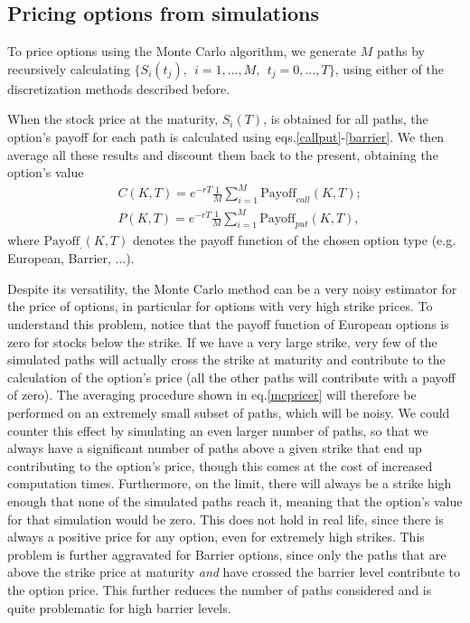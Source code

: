 \subsection{Pricing options from simulations}
\label{subsection:Pricing options from simulations}
To price options using the Monte Carlo algorithm, we generate $M$ paths by recursively calculating $\{S_i(t_j),\ \ i=1,\ldots,M,\ \ t_j=0,\ldots,T\}$, using either of the discretization methods described before.

When the stock price at the maturity, $S_i(T)$, is obtained for all paths, the option's payoff for each path is calculated using eqs.\eqref{callput}-\eqref{barrier}. We then average all these results and discount them back to the present, obtaining the option's value
\begin{equation}\label{mcpricer}
\begin{split}
&C(K,T)=e^{-rT}\frac{1}{M}\sum_{i=1}^M\text{Payoff}_{call}(K,T);\\
&P(K,T)=e^{-rT}\frac{1}{M}\sum_{i=1}^M\text{Payoff}_{put}(K,T),
\end{split}
\end{equation}
\noindent where $\text{Payoff}_{\cdot}(K,T)$ denotes the payoff function of the chosen option type (e.g. European, Barrier, ...).
 

Despite its versatility, the Monte Carlo method can be a very noisy estimator for the price of options, in particular for options with very high strike prices. To understand this problem, notice that the payoff function of European options is zero for stocks below the strike. If we have a very large strike, very few of the simulated paths will actually cross the strike at maturity and contribute to the calculation of the option's price (all the other paths will contribute with a payoff of zero). The averaging procedure shown in eq.\eqref{mcpricer} will therefore be performed on an extremely small subset of paths, which will be noisy.
We could counter this effect by simulating an even larger number of paths, so that we always have a significant number of paths above a given strike that end up contributing to the option's price, though this comes at the cost of increased computation times.
Furthermore, on the limit, there will always be a strike high enough that none of the simulated paths reach it, meaning that the option's value for that simulation would be zero. This does not hold in real life, since there is always a positive price for any option, even for extremely high strikes.
This problem is further aggravated for Barrier options, since only the paths that are above the strike price at maturity \emph{and} have crossed the barrier level contribute to the option price. This further reduces the number of paths considered and is quite problematic for high barrier levels.

